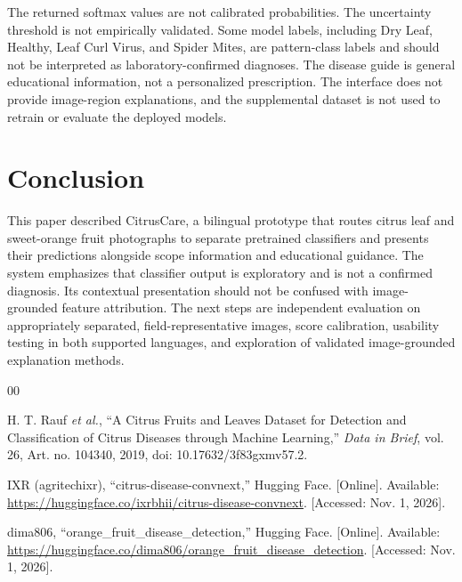\documentclass[conference]{IEEEtran}
\begin{document}
The returned softmax values are not calibrated probabilities. The uncertainty threshold is not empirically validated. Some model labels, including Dry Leaf, Healthy, Leaf Curl Virus, and Spider Mites, are pattern-class labels and should not be interpreted as laboratory-confirmed diagnoses. The disease guide is general educational information, not a personalized prescription. The interface does not provide image-region explanations, and the supplemental dataset is not used to retrain or evaluate the deployed models.

\section{Conclusion}
This paper described CitrusCare, a bilingual prototype that routes citrus leaf and sweet-orange fruit photographs to separate pretrained classifiers and presents their predictions alongside scope information and educational guidance. The system emphasizes that classifier output is exploratory and is not a confirmed diagnosis. Its contextual presentation should not be confused with image-grounded feature attribution. The next steps are independent evaluation on appropriately separated, field-representative images, score calibration, usability testing in both supported languages, and exploration of validated image-grounded explanation methods.

\begin{thebibliography}{00}

H. T. Rauf \emph{et al.}, ``A Citrus Fruits and Leaves Dataset for Detection and Classification of Citrus Diseases through Machine Learning,'' \emph{Data in Brief}, vol. 26, Art. no. 104340, 2019, doi: 10.17632/3f83gxmv57.2.

IXR (agritechixr), ``citrus-disease-convnext,'' Hugging Face. [Online]. Available: \url{https://huggingface.co/ixrbhii/citrus-disease-convnext}. [Accessed: Nov. 1, 2026].

dima806, ``orange\_fruit\_disease\_detection,'' Hugging Face. [Online]. Available: \url{https://huggingface.co/dima806/orange_fruit_disease_detection}. [Accessed: Nov. 1, 2026].

\end{thebibliography}
\end{document}
